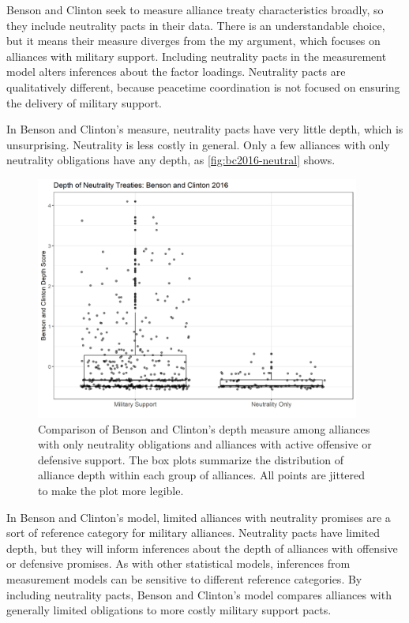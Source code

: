 \documentclass[12pt]{article}
\begin{document}
Benson and Clinton seek to measure alliance treaty characteristics broadly, so they include neutrality pacts in their data. 
There is an understandable choice, but it means their measure diverges from the my argument, which focuses on alliances with military support. 
Including neutrality pacts in the measurement model alters inferences about the factor loadings. 
Neutrality pacts are qualitatively different, because peacetime coordination is not focused on ensuring the delivery of military support. 


In Benson and Clinton's measure, neutrality pacts have very little depth, which is unsurprising.
Neutrality is less costly in general.  
Only a few alliances with only neutrality obligations have any depth, as \autoref{fig:bc2016-neutral} shows.  

\begin{figure}[htbp]
	\centering
		\includegraphics[width=0.95\textwidth]{bc2016-neutral.png}
	\caption{Comparison of Benson and Clinton's depth measure among alliances with only neutrality obligations and alliances with active offensive or defensive support. The box plots summarize the distribution of alliance depth within each group of alliances. All points are jittered to make the plot more legible.}
	\label{fig:bc2016-neutral}
\end{figure}


In Benson and Clinton's model, limited alliances with neutrality promises are a sort of reference category for military alliances. 
Neutrality pacts have limited depth, but they will inform inferences about the depth of alliances with offensive or defensive promises. 
As with other statistical models, inferences from measurement models can be sensitive to different reference categories. 
By including neutrality pacts, Benson and Clinton's model compares alliances with generally limited obligations to more costly military support pacts.
\end{document}
